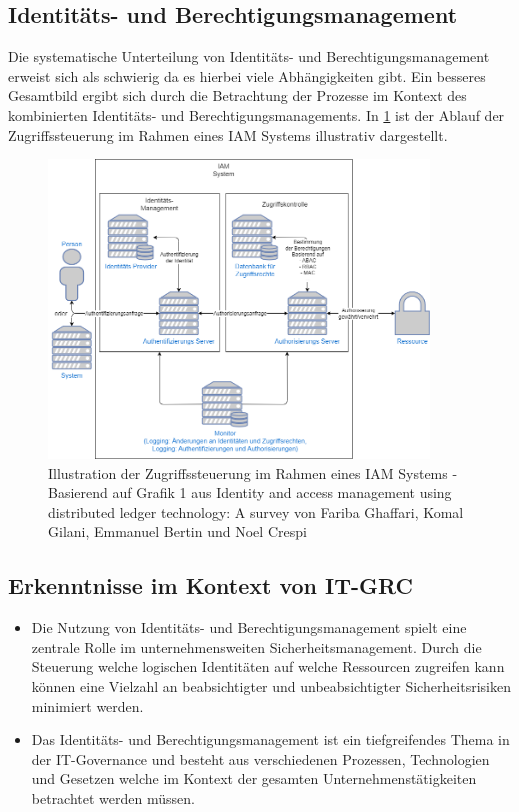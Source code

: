\documentclass[11pt]{article}
\begin{document}
\subsection{Identitäts- und Berechtigungsmanagement}
Die systematische Unterteilung von Identitäts- und Berechtigungsmanagement erweist sich als schwierig da es hierbei viele Abhängigkeiten gibt. Ein besseres Gesamtbild ergibt sich durch die Betrachtung der Prozesse im Kontext des kombinierten Identitäts- und Berechtigungsmanagements. In \cref{figure:iam} ist der Ablauf der Zugriffssteuerung im Rahmen eines IAM Systems illustrativ dargestellt.
\begin{figure}[H]
  \centering
  \includegraphics[width=0.9\textwidth]{assets/accessmanagement2.png}
  \caption{Illustration der Zugriffssteuerung im Rahmen eines IAM Systems - Basierend auf Grafik 1 aus Identity and access management using distributed ledger technology: A survey von Fariba Ghaffari, Komal Gilani, Emmanuel Bertin und Noel Crespi}\label{figure:iam}
\end{figure}
\subsection{Erkenntnisse im Kontext von IT-GRC}
\begin{itemize}
  \item Die Nutzung von Identitäts- und Berechtigungsmanagement spielt eine zentrale Rolle im unternehmensweiten Sicherheitsmanagement. Durch die Steuerung welche logischen Identitäten auf welche Ressourcen zugreifen kann können eine Vielzahl an beabsichtigter und unbeabsichtigter Sicherheitsrisiken minimiert werden.
  \item Das Identitäts- und Berechtigungsmanagement ist ein tiefgreifendes Thema in der IT-Governance und besteht aus verschiedenen Prozessen, Technologien und Gesetzen welche im Kontext der gesamten Unternehmenstätigkeiten betrachtet werden müssen.
\end{itemize}
\end{document}
